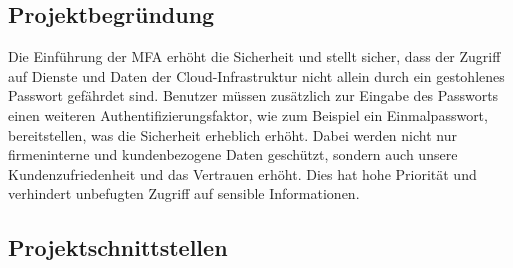 \subsection{Projektbegründung} 
\label{sec:Projektbegruendung}
Die Einführung der MFA erhöht die Sicherheit und stellt sicher, dass der Zugriff 
auf Dienste und Daten der Cloud-Infrastruktur nicht allein durch ein gestohlenes
Passwort gefährdet sind.
Benutzer müssen zusätzlich zur Eingabe des Passworts einen weiteren Authentifizierungsfaktor, 
wie zum Beispiel ein Einmalpasswort, bereitstellen, was die Sicherheit erheblich erhöht. 
Dabei werden nicht nur firmeninterne und kundenbezogene Daten geschützt, sondern auch 
unsere Kundenzufriedenheit und das Vertrauen erhöht. Dies hat hohe Priorität und 
verhindert unbefugten Zugriff auf sensible Informationen.


\subsection{Projektschnittstellen} 
\label{sec:Projektschnittstellen}

